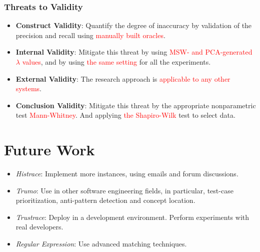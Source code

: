 \documentclass[12pt,hyperref=true,mathserif]{beamer}
\begin{document}
\begin{frame}
\frametitle{Threats to Validity}
\begin{itemize}
  \item \textbf{Construct Validity}: Quantify the degree of inaccuracy by validation of the precision and recall using \textcolor{red}{manually built oracles}.\\[8pt]
  \item \textbf{Internal Validity}: Mitigate this threat by using \textcolor{red}{MSW- and PCA-generated $\lambda$ values}, and by using \textcolor{red}{the same setting} for all the experiments.\\[8pt]
  \item \textbf{External Validity}: The research approach is \textcolor{red}{applicable to any other systems}.\\[8pt]
  \item \textbf{Conclusion Validity}: Mitigate this threat by the appropriate nonparametric test \textcolor{red}{Mann-Whitney}. And applying \textcolor{red}{the Shapiro-Wilk} test to select data.
\end{itemize}
\end{frame}

\section{Future Work}
\begin{frame}
\begin{itemize}
  \item \textit{Histrace}: Implement more instances, using emails and forum discussions.\\[6pt]
  \item \textit{Trumo}: Use in other software engineering fields, in particular, test-case prioritization, anti-pattern detection and concept location.\\[6pt]
  \item \textit{Trustrace}: Deploy in a development environment. Perform experiments with real developers.\\[6pt]
  \item \textit{Regular Expression}: Use advanced matching techniques.\\[6pt]
\end{itemize}
\end{frame}
\end{document}
